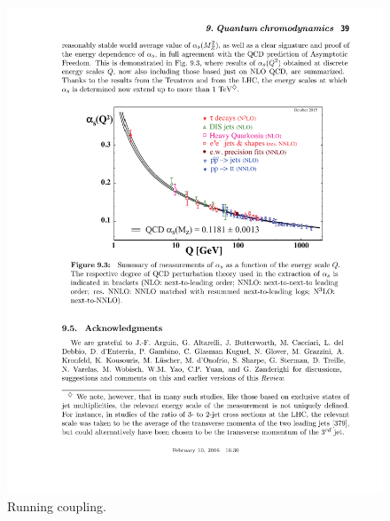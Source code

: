 \documentclass[12pt, a4paper, twoside]{book}
\begin{document}
\begin{figure}[t]
	\centering
	\includegraphics[width=\textwidth]{QCDRunningCoupling}
	\caption{Running coupling.}\label{fig:RunningCoupling}
\end{figure}
\end{document}
